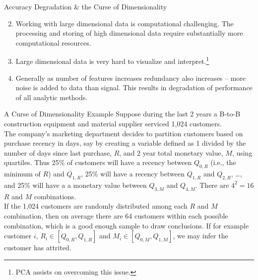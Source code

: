 \documentclass[pdf]{beamer}
\theoremstyle{remark}
\theoremstyle{definition}
\begin{document}
\begin{frame}[t]{Accuracy Degradation \& the Curse of Dimensionality}
\begin{enumerate}
  \setcounter{enumi}{1}
  \item Working with large dimensional data is computational challenging. The processing and storing of high dimensional data require substantially more computational resources. 
  \item Large dimensional data is very hard to visualize and interpret.\footnote{PCA assists on overcoming this issue.}
  \item Generally as number of features increases redundancy also increases -- more noise is added to data than signal. This results in degradation of performance of all analytic methods. 
\end{enumerate}
\end{frame}

\begin{frame}[t]{A Curse of Dimensionality Example}
Suppose during the last 2 years a B-to-B construction equipment and material supplier serviced 1,024 customers. \\
\vspace{1.5ex}
The company's marketing department decides to partition customers based on purchase recency in days, say by creating a variable defined as 1 divided by the number of days since last purchase, $R$, and 2 year total monetary value, $M$, using quartiles.  Thus 25\% of customers will have a recency between $Q_{0,R}$ (i.e., the minimum of $R$) and $Q_{1,R}$, 25\% will have a recency between $Q_{1,R}$ and $Q_{2,R}$, \ldots, and 25\%  will have a a monetary value between $Q_{3,M}$ and $Q_{4,M}$.  There are $4^2 = 16$ $R$ and $M$ combinations.  \\
\vspace{1.5ex}
If the 1,024 customers are randomly distributed among each $R$ and $M$ combination, then on average there are 64 customers within each possible combination, which is a good enough sample to draw conclusions. If for example customer $i$, $R_i \in [Q_{0,R},Q_{1,R}]$ and $M_i \in [Q_{0,M},Q_{1,M}]$, we may infer the customer has attrited. \\
\end{frame}
\end{document}
